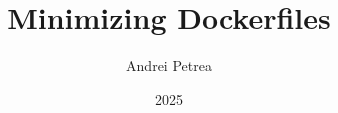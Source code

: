 \title{Minimizing Dockerfiles}
\author{Andrei Petrea}
\date{2025}



\newcommand{\project}{Minimizing Dockerfiles}

